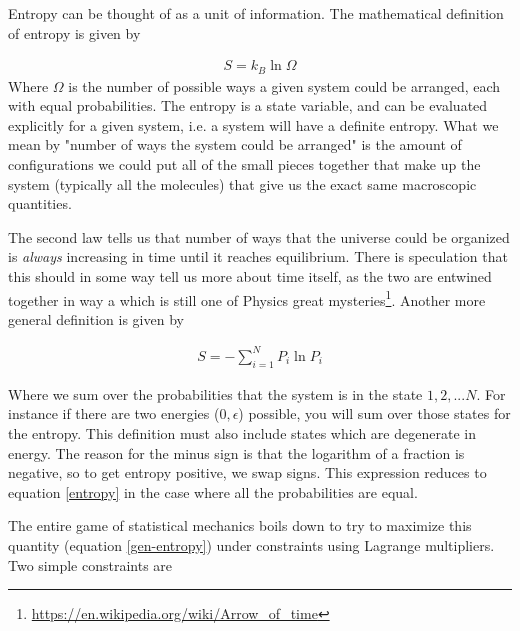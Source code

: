 Entropy can be thought of as a unit of information. The mathematical definition of entropy is given by

\begin{align}\label{entropy}
S = k_B\ln\Omega
\end{align}
Where $\Omega$ is the number of possible ways a given system could be arranged, each with equal probabilities. The entropy is a state variable, and can be evaluated explicitly for a given system, i.e. a system will have a definite entropy. What we mean by "number of ways the system could be arranged" is the amount of configurations we could put all of the small pieces together that make up the system (typically all the molecules) that give us the exact same macroscopic quantities. %



 The second law tells us that number of ways that the universe could be organized is \emph{always} increasing in time until it reaches equilibrium. There is speculation that this should in some way tell us more about time itself, as the two are entwined together in way a which is still one of Physics great mysteries\footnote{\url{https://en.wikipedia.org/wiki/Arrow_of_time}}. Another more general definition is given by

\begin{align}\label{gen-entropy}
S = -\sum_{i=1}^N P_i\ln P_i
\end{align}

Where we sum over the probabilities that the system is in the state $1,2,... N$. For instance if there are two energies ($0,\epsilon$) possible, you will sum over those states for the entropy. This definition must also include states which are degenerate in energy. The reason for the minus sign is that the logarithm of a fraction is negative, so to get entropy positive, we swap signs. This expression reduces to equation \ref{entropy} in the case where all the probabilities are equal. 

The entire game of statistical mechanics boils down to try to maximize this quantity (equation \ref{gen-entropy}) under constraints using Lagrange multipliers. Two simple constraints are


